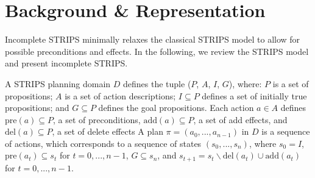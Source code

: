 \documentclass{article}
\def\citep#1{\cite{#1}} \def\citet#1{\citeA{#1}}
\def\und#1{\noindent{\bf #1}:}
\def\und#1{\medskip{\noindent\bf #1:}}
\begin{document}
\section{Background \& Representation}\label{sec:background}

Incomplete STRIPS minimally relaxes the classical STRIPS model to allow for possible preconditions and effects.  In the following, we review the STRIPS model and present incomplete STRIPS.

\und{STRIPS Domains} A STRIPS  \citep{strips} planning domain $D$  defines the tuple ($P$, $A$, $I$, $G$), where: $P$ is a set of propositions; $A$ is a set of action descriptions; $I \subseteq P$ defines a set of initially true propositions; and  $G \subseteq P$ defines the goal propositions.  Each action $a \in A$ defines $\text{pre}(a) \subseteq P$, a set of preconditions, $\text{add}(a) \subseteq P$, a set of add effects, and $\text{del}(a) \subseteq P$, a set of delete effects
%
A plan $\pi = (a_0, ..., a_{n-1})$ in $D$ is a sequence of actions, which corresponds to a sequence of states $(s_0, ..., s_n)$, where $s_0 = I$, $\text{pre}(a_t) \subseteq s_t$ for $t = 0,..., n-1$, $G \subseteq s_n$, and
$s_{t+1} = s_t \backslash \text{del}(a_t) \cup \text{add}(a_t)$ for $t = 0,..., n-1$.
%
\end{document}
